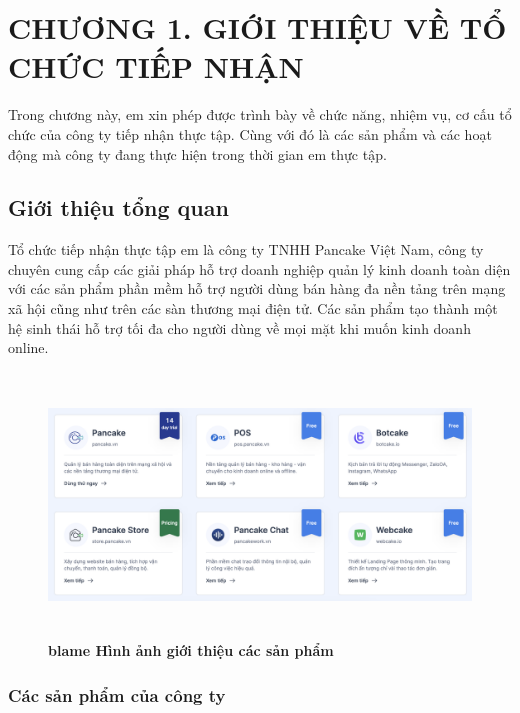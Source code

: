 
\section*{CHƯƠNG 1. GIỚI THIỆU VỀ TỔ CHỨC TIẾP NHẬN}
\setcounter{section}{1}
\setcounter{subsection}{0} %
\setcounter{table}{0} %
\setcounter{figure}{0} %
Trong chương này, em xin phép được trình bày về chức năng, nhiệm vụ, cơ cấu tổ chức của công ty
tiếp nhận thực tập. Cùng với đó là các sản phẩm và các hoạt động mà công ty đang thực hiện 
trong thời gian em thực tập.

\subsection{Giới thiệu tổng quan}
Tổ chức tiếp nhận thực tập em là công ty TNHH Pancake Việt Nam, công ty chuyên cung cấp các giải pháp
hỗ trợ doanh nghiệp quản lý kinh doanh toàn diện với các sản phẩm phần mềm hỗ trợ người dùng bán hàng đa nền
tảng trên mạng xã hội cũng như trên các sàn thương mại điện tử. Các sản phẩm tạo thành một hệ sinh thái hỗ trợ
tối đa cho người dùng về mọi mặt khi muốn kinh doanh online.

\begin{figure}[H]
  \centering
  \includegraphics[width=15cm,height=7cm]{Images/pancake/all_items_pancake.png}
  \caption[Hình ảnh giới thiệu các sản phẩm]{\bfseries \fontsize{12pt}{0pt}blame
  \selectfont Hình ảnh giới thiệu các sản phẩm}
  \label{ttlk} %
\end{figure}

\subsubsection{Các sản phẩm của công ty}
